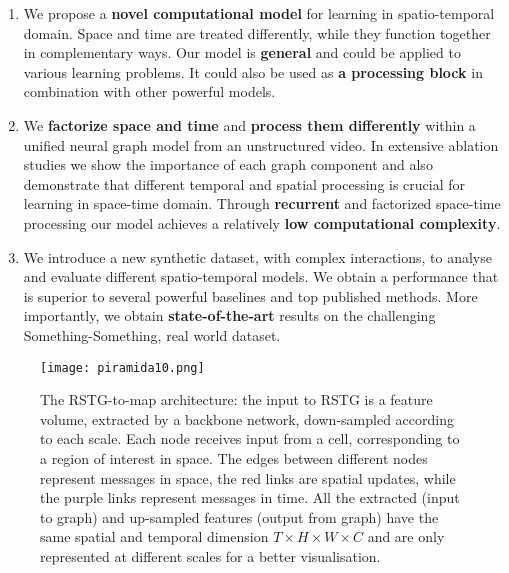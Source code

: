 \documentclass{article}
\begin{document}
\begin{enumerate}
    \item We propose a \textbf{novel computational model} for learning in spatio-temporal domain. Space and time are treated differently, while they function together in complementary ways. Our model is \textbf{general} and could be applied to various learning problems. It could also be used as \textbf{a processing block} in combination with other powerful models.

    \item We \textbf{factorize space and time} and \textbf{process them differently} within a unified neural graph model from an unstructured video. In extensive ablation studies we show the importance of each graph component and also demonstrate that different temporal and spatial processing is crucial for learning in space-time domain. Through \textbf{recurrent} and factorized space-time processing
    our model achieves a relatively \textbf{low computational complexity}. 
    
    \item We introduce a new synthetic dataset, with complex interactions, to analyse and evaluate different spatio-temporal models. We obtain a performance that is superior to several powerful baselines and top published methods. More importantly, we obtain \textbf{state-of-the-art} results on the challenging Something-Something, real world dataset.
    
\end{enumerate}

\begin{figure}[t!]
\begin{center}
\centerline{\texttt{[image: piramida10.png]}}
\caption{The RSTG-to-map architecture: the input to RSTG is a feature volume, extracted by a backbone network, down-sampled according to each scale. Each node receives input from a cell, corresponding to a region of interest in space. The edges between different nodes represent messages in space, the red links are spatial updates, while the purple links represent messages in time. All the extracted (input to graph) and up-sampled features (output from graph) have the same spatial and temporal dimension $T \times H \times W \times C$ and are only represented at different scales for a better visualisation.}
\label{fig:main_graph_figure}
\end{center}
\vskip -0.2in
\end{figure}
\end{document}
